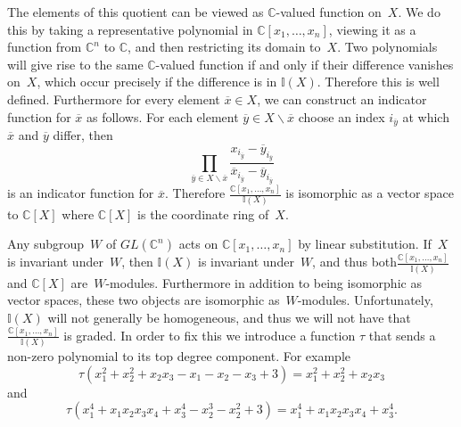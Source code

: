 \documentclass[ALCO,ThmDefs,Unicode,epreuves]{cedram}
\begin{document}
The elements of this quotient can be viewed as $\mathbb{C}$-valued function on~$X$. We do this by taking a representative 
polynomial in $\mathbb{C}[x_1,\ldots, x_n]$, viewing it as a function from $\mathbb{C}^n$ to $\mathbb{C}$, and then restricting 
its domain to~$X$. Two polynomials will give rise to the same $\mathbb{C}$-valued function if and only if their difference 
vanishes on~$X$, which occur precisely if the difference is in $\mathbb{I}(X)$. Therefore this is well defined. Furthermore 
for every element $\overline{x}\in X$, we can construct an indicator function for $\overline{x}$ as follows. For each element 
$\overline{y}\in X\backslash \overline{x}$ choose an index $i_{\overline{y}}$ at which $\overline{x}$ and $\overline{y}$ 
differ, then
\begin{equation}
\prod_{\overline{y}\in X\backslash \overline{x}} 
\frac{x_{i_{\overline{y}}}-\overline{y}_{i_{\overline{y}}}}{\overline{x}_{i_{\overline{y}}}-\overline{y}_{i_{\overline{y}}}}
\end{equation}
is an indicator function for $\overline{x}$. Therefore $\frac{\mathbb{C}[x_1,\ldots, x_n]}{\mathbb{I}(X)}$ is 
isomorphic as a vector space to $\mathbb{C}[X]$ where $\mathbb{C}[X]$ is the coordinate ring of~$X$.

Any subgroup~$W$ of $GL(\mathbb{C}^n)$ acts on $\mathbb{C}[x_1,\ldots, x_n]$ by linear substitution. If~$X$ is invariant 
under~$W$, then $\mathbb{I}(X)$ is invariant under~$W$, and thus both$\frac{\mathbb{C}[x_1,\ldots, x_n]}{\mathbb{I}(X)}$ and 
$\mathbb{C}[X]$ are~$W$-modules. Furthermore in addition to being isomorphic as vector spaces, these two objects are 
isomorphic as~$W$-modules. Unfortunately, $\mathbb{I}(X)$ will not generally be homogeneous, and thus we will not have that 
$\frac{\mathbb{C}[x_1,\ldots, x_n]}{\mathbb{I}(X)}$ is graded. In order to fix this we introduce a function $\tau$ that sends 
a non-zero polynomial to its top degree component. For 
example
\begin{equation}
\tau(x_1^2+x_2^2+x_2x_3-x_1-x_2-x_3+3)=x_1^2+x_2^2+x_2x_3
\end{equation}
and
\begin{equation}
\tau(x_1^4+x_1x_2x_3x_4+x_3^4-x_2^3-x_2^2+3)=x_1^4+x_1x_2x_3x_4+x_3^4.
\end{equation}
\end{document}
